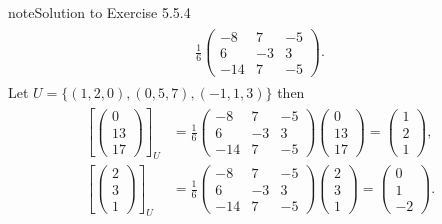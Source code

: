 \documentclass[letterpaper,10pt,english]{jupyterBook}
\begin{document}
\begin{sphinxadmonition}{note}{Solution to Exercise 5.5.4}
\begin{equation*}
\begin{split}
\begin{align*}
    \frac{1}{6} \begin{pmatrix} -8 & 7 & -5 \\ 6 & -3 & 3 \\ -14 & 7 & -5 \end{pmatrix}.
\end{align*} \end{split}
\end{equation*}
\sphinxAtStartPar
Let \(U = \{(1, 2, 0), (0, 5, 7), (-1, 1, 3)\}\) then
\begin{equation*}
\begin{split} \begin{align*}
    \left[ \begin{pmatrix} 0 \\ 13 \\ 17 \end{pmatrix} \right]_U &= 
    \frac{1}{6} \begin{pmatrix} -8 & 7 & -5 \\ 6 & -3 & 3 \\ -14 & 7 & -5 \end{pmatrix}
    \begin{pmatrix} 0 \\ 13 \\ 17 \end{pmatrix} =
    \begin{pmatrix} 1 \\ 2 \\ 1 \end{pmatrix}, \\
    \left[ \begin{pmatrix} 2 \\ 3 \\ 1 \end{pmatrix} \right]_U &= 
    \frac{1}{6} \begin{pmatrix} -8 & 7 & -5 \\ 6 & -3 & 3 \\ -14 & 7 & -5 \end{pmatrix}
    \begin{pmatrix} 2 \\ 3 \\ 1 \end{pmatrix} =
    \begin{pmatrix} 0 \\ 1 \\ -2  \end{pmatrix}.
\end{align*} \end{split}
\end{equation*}\end{sphinxadmonition}
 \label{_pages/A5_Vector_spaces_exercises_solutions:_pages/A5_Vector_spaces_exercises_solutions-solution-4}
\end{document}
